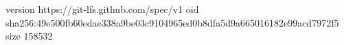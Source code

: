 version https://git-lfs.github.com/spec/v1
oid sha256:49e500fb60edae338a9be03c9104965ed0b8dfa5d9a665016182e99acd7972f5
size 158532

